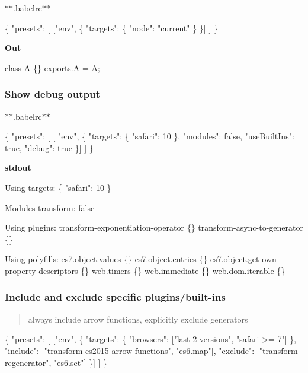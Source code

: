 $\ast$$\ast$.babelrc$\ast$$\ast$


\begin{DoxyCode}
\{
  "presets": [
    ["env", \{
      "targets": \{
        "node": "current"
      \}
    \}]
  ]
\}
\end{DoxyCode}


{\bfseries Out}


\begin{DoxyCode}
class A \{\}
exports.A = A;
\end{DoxyCode}


\subsubsection*{Show debug output}

$\ast$$\ast$.babelrc$\ast$$\ast$


\begin{DoxyCode}
\{
  "presets": [
    [ "env", \{
      "targets": \{
        "safari": 10
      \},
      "modules": false,
      "useBuiltIns": true,
      "debug": true
    \}]
  ]
\}
\end{DoxyCode}


{\bfseries stdout}


\begin{DoxyCode}
Using targets:
\{
  "safari": 10
\}

Modules transform: false

Using plugins:
  transform-exponentiation-operator \{\}
  transform-async-to-generator \{\}

Using polyfills:
  es7.object.values \{\}
  es7.object.entries \{\}
  es7.object.get-own-property-descriptors \{\}
  web.timers \{\}
  web.immediate \{\}
  web.dom.iterable \{\}
\end{DoxyCode}


\subsubsection*{Include and exclude specific plugins/built-\/ins}

\begin{quote}
always include arrow functions, explicitly exclude generators \end{quote}



\begin{DoxyCode}
\{
  "presets": [
    ["env", \{
      "targets": \{
        "browsers": ["last 2 versions", "safari >= 7"]
      \},
      "include": ["transform-es2015-arrow-functions", "es6.map"],
      "exclude": ["transform-regenerator", "es6.set"]
    \}]
  ]
\}
\end{DoxyCode}


